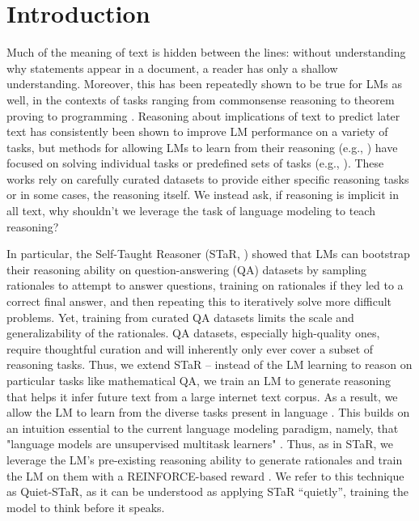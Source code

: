 \documentclass{article} %
\begin{document}
\section{Introduction}
\label{sec:intro}
Much of the meaning of text is hidden between the lines: without understanding why statements appear in a document, a reader has only a shallow understanding. Moreover, this has been repeatedly shown to be true for LMs as well, in the contexts of tasks ranging from commonsense reasoning to theorem proving to programming \citep{wei_chain_2022,nye2021show,zelikman2022star,zelikman2022parsel,kojima_large_2022}. Reasoning about implications of text to predict later text has consistently been shown to improve LM performance on a variety of tasks, but methods for allowing LMs to learn from their reasoning (e.g., \citealt{zelikman2022star}) have focused on solving individual tasks or predefined sets of tasks (e.g., \citealt{wei_finetuned_2021}). These works rely on carefully curated datasets to provide either specific reasoning tasks or in some cases, the reasoning itself. We instead ask, if reasoning is implicit in all text, why shouldn't we leverage the task of language modeling to teach reasoning?

In particular, the Self-Taught Reasoner (STaR, \citealt{zelikman2022star}) showed that LMs can bootstrap their reasoning ability on question-answering (QA) datasets by sampling rationales to attempt to answer questions, training on rationales if they led to a correct final answer, and then repeating this to iteratively solve more difficult problems. Yet, training from curated QA datasets limits the scale and generalizability of the rationales. QA datasets, especially high-quality ones, require thoughtful curation and will inherently only ever cover a subset of reasoning tasks.
Thus, we extend STaR -- instead of the LM learning to reason on particular tasks like mathematical QA, we train an LM to generate reasoning that helps it infer future text from a large internet text corpus. As a result, we allow the LM to learn from the diverse tasks present in language \citep{weber2021language}. 
This builds on an intuition essential to the current language modeling paradigm, namely, that "language models are unsupervised multitask learners" \citep{radford2019language}.
Thus, as in STaR, we leverage the LM's pre-existing reasoning ability to generate rationales and train the LM on them with a REINFORCE-based reward \citep{williams1992simple}. We refer to this technique as Quiet-STaR, as it can be understood as applying STaR ``quietly'', training the model to think before it speaks.
\end{document}
